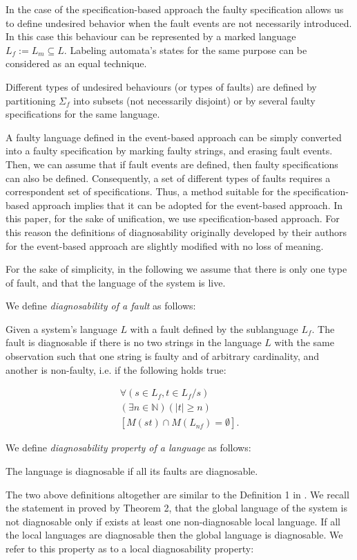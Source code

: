 \documentclass[letterpaper, 10pt, conference]{ieeeconf}
\begin{document}
In the case of the specification-based approach the faulty specification allows
us to define undesired behavior when the fault events are not necessarily
introduced. In this case this behaviour can be represented by a marked
language $L_f := L_m \subseteq L$. Labeling automata's states for the same
purpose can be considered as an equal technique.

Different types of undesired behaviours (or types of faults) are defined by
partitioning $\Sigma_f$ into subsets (not necessarily disjoint) or by several
faulty specifications for the same language. 

A faulty language defined in the event-based approach can be simply converted
into a faulty specification by marking faulty strings, and erasing fault events.
Then, we can assume that if fault events are defined, then faulty specifications
can also be defined. Consequently, a set of different types of faults requires a
correspondent set of specifications.
Thus, a method suitable for the specification-based approach implies that it can
be adopted for the event-based approach. In this paper, for the sake of
unification, we use specification-based approach. For this reason the
definitions of diagnosability originally developed by their authors for the
event-based approach are slightly modified with no loss of meaning.

For the sake of simplicity, in the following we assume that there is only one
type of fault, and that the language of the system is live.

We define \emph{diagnosability of a fault} as follows:
\begin{definition} 
\label{def:fault_is_diag}
Given a system's language $L$ with a fault defined by the sublanguage $L_f$. The
fault is diagnosable if there is no two strings in the language $L$ with the
same observation such that one string is faulty and of arbitrary cardinality,
and another is non-faulty, i.e. if the following holds true:
\end{definition}
\begin{equation}
\begin{array}{l}
	\forall(s \in L_f, t \in L_f/s) 
	\\
	(\exists n \in \mathbb{N})
	(|t| \geq n) 
	\\
	\left[ M(st) \cap M(L_{nf}) = \emptyset \right].
\end{array}
\end{equation}

We define \emph{diagnosability property of a language} as follows:
\begin{definition}
The language is diagnosable if all its faults are diagnosable.
\end{definition}
The two above definitions altogether are similar to the Definition 1 in
\cite{sampath_diagnosability_1995}. We recall the statement in
\cite{contant_diagnosability_2006} proved by Theorem 2, that the global
language of the system is not diagnosable only if exists at least one non-diagnosable
local language. If all the local languages are diagnosable then the global
language is diagnosable. We refer to this property as to a local diagnosability
property:
\end{document}
